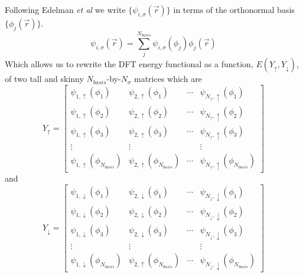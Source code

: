 Following Edelman {\it et al} we write
$\{ \psi_{i,\sigma}(\vec{r}) \}$ in terms of the orthonormal basis
$\{ \phi_j(\vec{r}) \}$.
\begin{equation}
\psi_{i,\sigma}(\vec{r}) = \sum_{j}^{N_{basis}} 
                           \psi_{i,\sigma}(\phi_j) 
                            \phi_j(\vec{r})
\end{equation}
Which allows us to rewrite the DFT energy functional as a function,
$E(Y_{\uparrow},Y_{\downarrow})$, of two tall and skinny 
$N_{basis}$-by-$N_{\sigma}$ matrices which are
\begin{equation}
Y_{\uparrow}=\left[\begin{array}{rrrr}
                    \psi_{1,\uparrow}(\phi_1) 
                     & \psi_{2,\uparrow}(\phi_1) 
                     & \cdots
                     & \psi_{N_{\uparrow},\uparrow}(\phi_1) \\
                    \psi_{1,\uparrow}(\phi_2) 
                     & \psi_{2,\uparrow}(\phi_2) 
                     & \cdots
                     & \psi_{N_{\uparrow},\uparrow}(\phi_2) \\
                    \psi_{1,\uparrow}(\phi_3) 
                     & \psi_{2,\uparrow}(\phi_3) 
                     & \cdots
                     & \psi_{N_{\uparrow},\uparrow}(\phi_3) \\
                    \vdots 
                     & \vdots
                     &
                     & \vdots \\
                    \psi_{1,\uparrow}(\phi_{N_{basis}}) 
                     & \psi_{2,\uparrow}(\phi_{N_{basis}}) 
                     & \cdots
                     & \psi_{N_{\uparrow},\uparrow}(\phi_{N_{basis}})
                   \end{array}
               \right]
\end{equation}
and
\begin{equation}
Y_{\downarrow}=\left[\begin{array}{rrrr}
                    \psi_{1,\downarrow}(\phi_1) 
                     & \psi_{2,\downarrow}(\phi_1) 
                     & \cdots
                     & \psi_{N_{\downarrow},\downarrow}(\phi_1) \\
                    \psi_{1,\downarrow}(\phi_2) 
                     & \psi_{2,\downarrow}(\phi_2) 
                     & \cdots
                     & \psi_{N_{\downarrow},\downarrow}(\phi_2) \\
                    \psi_{1,\downarrow}(\phi_3) 
                     & \psi_{2,\downarrow}(\phi_3) 
                     & \cdots
                     & \psi_{N_{\downarrow},\downarrow}(\phi_3) \\
                    \vdots 
                     & \vdots
                     & 
                     & \vdots \\
                    \psi_{1,\downarrow}(\phi_{N_{basis}}) 
                     & \psi_{2,\uparrow}(\phi_{N_{basis}}) 
                     & \cdots
                     & \psi_{N_{\downarrow},\downarrow}(\phi_{N_{basis}})
                   \end{array}
               \right]
\end{equation}
